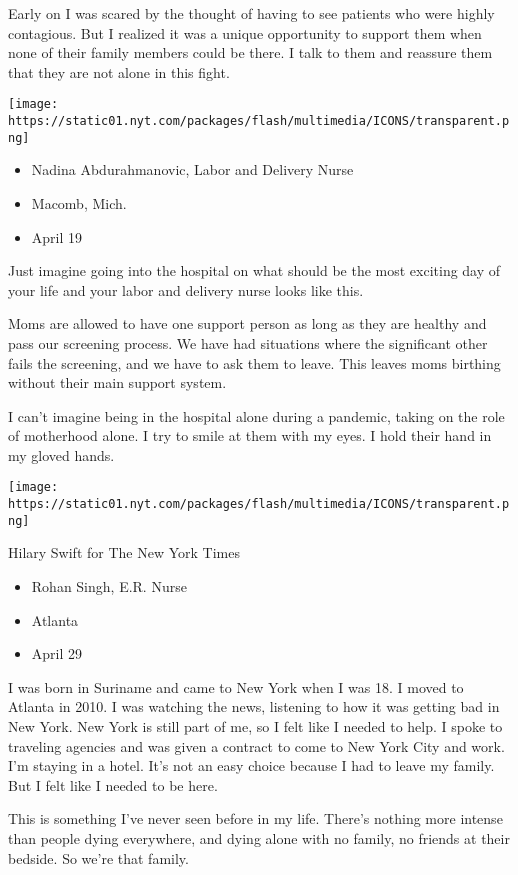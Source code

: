 Early on I was scared by the thought of having to see patients who were
highly contagious. But I realized it was a unique opportunity to support
them when none of their family members could be there. I talk to them
and reassure them that they are not alone in this fight.

\texttt{[image: https://static01.nyt.com/packages/flash/multimedia/ICONS/transparent.png]}

\begin{itemize}
\tightlist
\item
  Nadina Abdurahmanovic, Labor and Delivery Nurse
\item
  Macomb, Mich.
\item
  April 19
\end{itemize}

Just imagine going into the hospital on what should be the most exciting
day of your life and your labor and delivery nurse looks like this.

Moms are allowed to have one support person as long as they are healthy
and pass our screening process. We have had situations where the
significant other fails the screening, and we have to ask them to leave.
This leaves moms birthing without their main support system.

I can't imagine being in the hospital alone during a pandemic, taking on
the role of motherhood alone. I try to smile at them with my eyes. I
hold their hand in my gloved hands.

\texttt{[image: https://static01.nyt.com/packages/flash/multimedia/ICONS/transparent.png]}

Hilary Swift for The New York Times

\begin{itemize}
\tightlist
\item
  Rohan Singh, E.R. Nurse
\item
  Atlanta
\item
  April 29
\end{itemize}

I was born in Suriname and came to New York when I was 18. I moved to
Atlanta in 2010. I was watching the news, listening to how it was
getting bad in New York. New York is still part of me, so I felt like I
needed to help. I spoke to traveling agencies and was given a contract
to come to New York City and work. I'm staying in a hotel. It's not an
easy choice because I had to leave my family. But I felt like I needed
to be here.

This is something I've never seen before in my life. There's nothing
more intense than people dying everywhere, and dying alone with no
family, no friends at their bedside. So we're that family.

